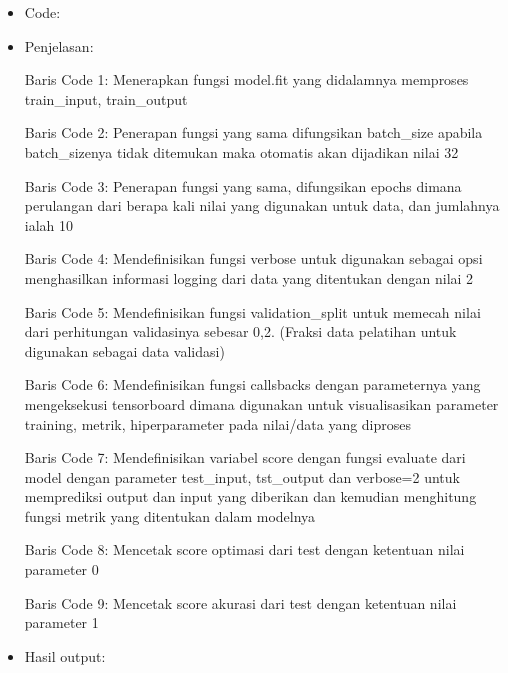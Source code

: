 \begin{itemize}
\item Code:


\item Penjelasan:

Baris Code 1: Menerapkan fungsi model.fit yang didalamnya memproses train\_input, train\_output

Baris Code 2: Penerapan fungsi yang sama difungsikan batch\_size apabila batch\_sizenya tidak ditemukan maka otomatis akan dijadikan nilai 32

Baris Code 3: Penerapan fungsi yang sama, difungsikan epochs dimana perulangan dari berapa kali nilai yang digunakan untuk data, dan jumlahnya ialah 10

Baris Code 4: Mendefinisikan fungsi verbose untuk digunakan sebagai opsi menghasilkan informasi logging dari data yang ditentukan dengan nilai 2

Baris Code 5: Mendefinisikan fungsi validation\_split untuk memecah nilai dari perhitungan validasinya sebesar 0,2. (Fraksi data pelatihan untuk digunakan sebagai data validasi)

Baris Code 6: Mendefinisikan fungsi callsbacks dengan parameternya yang mengeksekusi tensorboard dimana digunakan untuk visualisasikan parameter training, metrik, hiperparameter pada nilai/data yang diproses

Baris Code 7: Mendefinisikan variabel score dengan fungsi evaluate dari model dengan parameter test\_input, tst\_output dan verbose=2 untuk memprediksi output dan input yang diberikan dan kemudian menghitung fungsi metrik yang ditentukan dalam modelnya

Baris Code 8: Mencetak score optimasi dari test dengan ketentuan nilai parameter 0

Baris Code 9: Mencetak score akurasi dari test dengan ketentuan nilai parameter 1

\item Hasil output:


\end{itemize}
